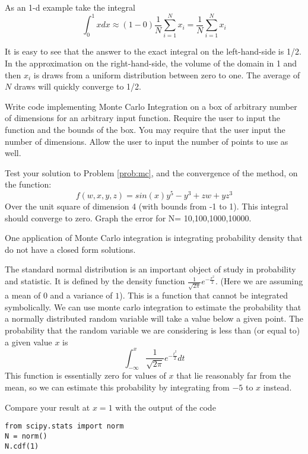 As an 1-d example take the integral 
\[
\int_0^1 x dx \approx (1-0)\frac{1}{N} \sum_{i=1}^N x_i=\frac{1}{N} \sum_{i=1}^N x_i
\]

It is easy to see that the answer to the exact integral on the left-hand-side is 1/2. In the approximation on the right-hand-side, the volume of the domain in 1 and then $x_i$ is draws from a uniform distribution between zero to one. The average of $N$ draws will quickly converge to 1/2. 

\begin{problem}
\label{prob:mc}
Write code implementing Monte Carlo Integration on a box of arbitrary number of dimensions for an arbitrary input function. Require the user to input the function and the bounds of the box. You may require that the user input the number of dimensions. Allow the user to input the number of points to use as well.
\end{problem}

\begin{problem}
\label{prob:mc_test}
Test your solution to Problem \ref{prob:mc}, and the convergence of the method, on the function:
\[
f(w,x,y,z) = sin(x) y^5 -y^3 + zw + yz^3
\]
Over the unit square of dimension 4 (with bounds from -1 to 1). This integral should converge to zero. Graph the error for N= 10,100,1000,10000.
\end{problem}

One application of Monte Carlo integration is integrating probability density that do not have a closed form solutions.

\begin{problem}
The standard normal distribution is an important object of study in probability and statistic.
It is defined by the density function $\frac{1}{\sqrt{2 \pi}} e^{- \frac{x^2}{2}}$.
(Here we are assuming a mean of $0$ and a variance of $1$).
This is a function that cannot be integrated symbolically.
We can use monte carlo integration to estimate the probability that a normally distributed random variable will take a value below a given point.
The probability that the random variable we are considering is less than (or equal to) a given value $x$ is
\[\int_{-\infty}^x \frac{1}{\sqrt{2 \pi}} e^{- \frac{t^2}{2}} dt\]
This function is essentially zero for values of $x$ that lie reasonably far from the mean, so we can estimate this probability by integrating from $-5$ to $x$ instead.

Compare your result at $x = 1$ with the output of the code
\begin{lstlisting}
from scipy.stats import norm
N = norm()
N.cdf(1)
\end{lstlisting}
\end{problem}

